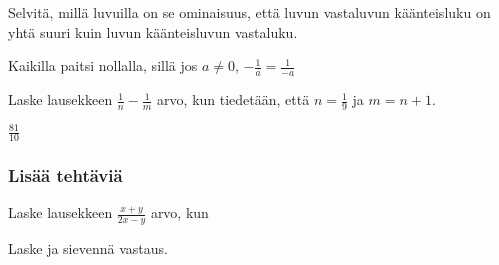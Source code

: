 \begin{tehtavasivu}
\begin{tehtava}
Selvitä, millä luvuilla on se ominaisuus, että luvun vastaluvun käänteisluku on yhtä suuri kuin luvun käänteisluvun vastaluku.
	\begin{vastaus}
Kaikilla paitsi nollalla, sillä jos $a \neq 0$, $-\frac{1}{a} = \frac{1}{-a}$
	\end{vastaus}
\end{tehtava}

\begin{tehtava}
	Laske lausekkeen $\frac{1}{n}-\frac{1}{m}$ arvo, kun tiedetään, että $n = \frac{1}{9}$ ja $m=n+1$.
	\begin{vastaus}
		$\frac{81}{10}$
	\end{vastaus}
\end{tehtava}


\subsubsection*{Lisää tehtäviä}

\begin{tehtava}
Laske lausekkeen $\frac{x+y}{2x-y}$ arvo, kun
\begin{vastaus}
\end{vastaus}
\end{tehtava}
 
\begin{tehtava}
Laske ja sievennä vastaus.
            \begin{vastaus}
            \end{vastaus}
\end{tehtava}
        
\begin{tehtava}
            \begin{vastaus}		
            \end{vastaus}
\end{tehtava}
        

\end{tehtavasivu}
